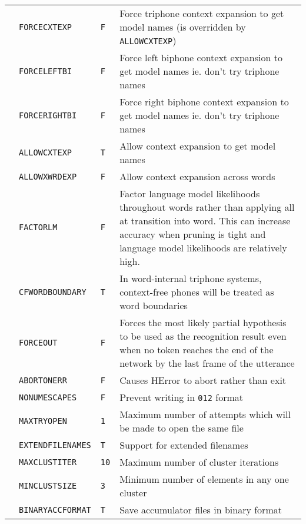 \begin{center}
\begin{supertabular}{|p{1.4cm}|l|l|p{6.6cm}|}
  & \texttt{FORCECXTEXP} & \texttt{F} & Force triphone context expansion to get 
  model names (is overridden by \texttt{ALLOWCXTEXP}) \\ 
  & \texttt{FORCELEFTBI} & \texttt{F} & Force left biphone
  context expansion to get model names ie. don't try triphone names \\ 
  & \texttt{FORCERIGHTBI} & \texttt{F} & Force right biphone
  context expansion to get model names ie. don't try triphone names \\ 
  & \texttt{ALLOWCXTEXP}  & \texttt{T} & Allow context expansion to get model names \\ 
  & \texttt{ALLOWXWRDEXP} & \texttt{F} & Allow context expansion across words \\ 
  & \texttt{FACTORLM}     & \texttt{F} & Factor language model likelihoods throughout words rather 
  than applying all at transition into word. This can increase accuracy when pruning is tight and 
  language model likelihoods are relatively high. \\  
  & \texttt{CFWORDBOUNDARY} & \texttt{T} & In word-internal triphone systems, context-free 
  phones will be treated as word boundaries \\ \hline

  & \texttt{FORCEOUT} & \texttt{F} & Forces the most likely partial hypothesis to be used as
  the recognition result even when no token reaches the end of the network by the last frame
  of the utterance \\ \hline

  & \texttt{ABORTONERR} & \texttt{F} & Causes HError to abort rather than exit \\ 
 & \texttt{NONUMESCAPES} & \texttt{F} & Prevent writing in \verb+012+ format \\ 
  & \texttt{MAXTRYOPEN} & \texttt{1} & Maximum number of
  attempts which will be made to open the same file \\ 
  & \texttt{EXTENDFILENAMES} & \texttt{T} & Support for extended
  filenames \\ \hline


  & \texttt{MAXCLUSTITER} & \texttt{10} & Maximum number
  of cluster iterations \\ 
 & \texttt{MINCLUSTSIZE} & \texttt{3} & Minimum number
  of elements in any one cluster \\ 
  & \texttt{BINARYACCFORMAT} & \texttt{T} & Save
  accumulator files in binary format \\ \hline


\end{supertabular}
\end{center}
